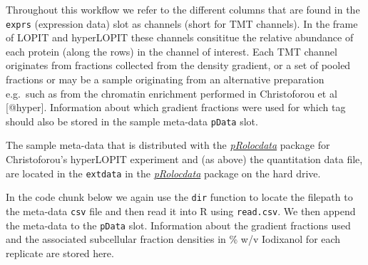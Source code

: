Throughout this workflow we refer to the different columns that are
found in the \texttt{exprs} (expression data) slot as channels (short
for TMT channels). In the frame of LOPIT and hyperLOPIT these channels
consititue the relative abundance of each protein (along the rows) in
the channel of interest. Each TMT channel originates from fractions
collected from the density gradient, or a set of pooled fractions or may
be a sample originating from an alternative preparation e.g.~such as
from the chromatin enrichment performed in Christoforou et al
{[}@hyper{]}. Information about which gradient fractions were used for
which tag should also be stored in the sample meta-data \texttt{pData}
slot.

The sample meta-data that is distributed with the
\emph{\href{http://bioconductor.org/packages/pRolocdata}{pRolocdata}}
package for Christoforou's hyperLOPIT experiment and (as above) the
quantitation data file, are located in the \texttt{extdata} in the
\emph{\href{http://bioconductor.org/packages/pRolocdata}{pRolocdata}}
package on the hard drive.

In the code chunk below we again use the \texttt{dir} function to locate
the filepath to the meta-data \texttt{csv} file and then read it into R
using \texttt{read.csv}. We then append the meta-data to the
\texttt{pData} slot. Information about the gradient fractions used and
the associated subcellular fraction densities in \% w/v Iodixanol for
each replicate are stored here.

\begin{Shaded}
\begin{Highlighting}[]
\StringTok{ } \NormalTok{,}
                \NormalTok{)}

\StringTok{ }\NormalTok{, } \NormalTok{, }
                      \NormalTok{, } \NormalTok{)}

\StringTok{ }\NormalTok{(fracinfo[, }\NormalTok{], fracinfo[, }\NormalTok{])}
\StringTok{ }\NormalTok{(fracinfo[, }\NormalTok{], fracinfo[, }\NormalTok{])}
\end{Highlighting}
\end{Shaded}

